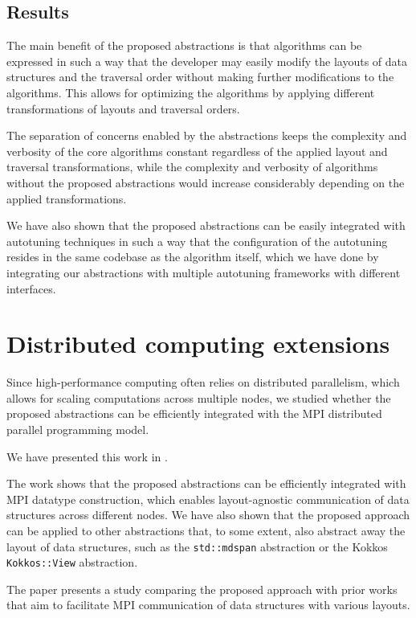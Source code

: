 \subsection{Results}\label{sec:abstractions-results}

The main benefit of the proposed abstractions is that algorithms can be expressed in such a way that the developer may easily modify the layouts of data structures and the traversal order without making further modifications to the algorithms. This allows for optimizing the algorithms by applying different transformations of layouts and traversal orders.

The separation of concerns enabled by the abstractions keeps the complexity and verbosity of the core algorithms constant regardless of the applied layout and traversal transformations, while the complexity and verbosity of algorithms without the proposed abstractions would increase considerably depending on the applied transformations.

We have also shown that the proposed abstractions can be easily integrated with autotuning techniques in such a way that the configuration of the autotuning resides in the same codebase as the algorithm itself, which we have done by integrating our abstractions with multiple autotuning frameworks with different interfaces.


\section{Distributed computing extensions}\label{sec:layout-agnostic}

Since high-performance computing often relies on distributed parallelism, which allows for scaling computations across multiple nodes, we studied whether the proposed abstractions can be efficiently integrated with the MPI distributed parallel programming model.

We have presented this work in .

The work shows that the proposed abstractions can be efficiently integrated with MPI datatype construction, which enables layout-agnostic communication of data structures across different nodes. We have also shown that the proposed approach can be applied to other abstractions that, to some extent, also abstract away the layout of data structures, such as the \cpp \lstinline{std::mdspan} abstraction or the Kokkos \lstinline{Kokkos::View} abstraction.

The paper presents a study comparing the proposed approach with prior works that aim to facilitate MPI communication of data structures with various layouts.

